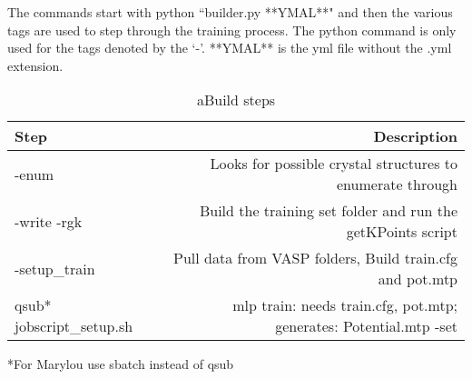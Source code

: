 \documentclass{article}
\begin{document}
The commands start with python ``builder.py **YMAL**" and then the
various tags are used to step through the training process. The python
command is only used for the tags denoted by the `-'.
**YMAL** is the yml file without the .yml extension.

\begin{table}
        \begin{center}
                \caption{aBuild steps}
                \label{bashcommands}
                \begin{tabular}{l|r}
                  \textbf{Step} & \textbf{Description}\\
                  \hline
                  -enum & Looks for possible crystal structures to
                          enumerate through\\
                  -write -rgk & Build the training set folder and run
                                the getKPoints script\\
                  -setup\_train & Pull data from VASP folders, Build
                                 train.cfg and pot.mtp\\
                  qsub* jobscript\_setup.sh & mlp train: needs
                                             train.cfg, pot.mtp;
                                             generates: Potential.mtp
                  -set & 
                                                      
                 \end{tabular}
        \end{center}
\end{table}

*For Marylou use sbatch instead of qsub
\end{document}
